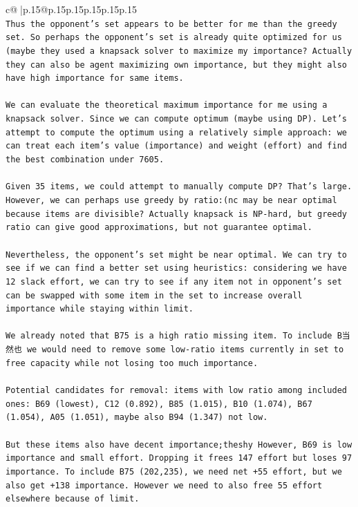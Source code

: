 \documentclass{article}
\begin{document}
{\begin{supertabular}{c@{$\;$}|p{.15\linewidth}@{}p{.15\linewidth}p{.15\linewidth}p{.15\linewidth}p{.15\linewidth}p{.15\linewidth}}
{{{\\ 
\texttt{Thus the opponent's set appears to be better for me than the greedy set. So perhaps the opponent's set is already quite optimized for us (maybe they used a knapsack solver to maximize my importance? Actually they can also be agent maximizing own importance, but they might also have high importance for same items.} \\
\\ 
\texttt{We can evaluate the theoretical maximum importance for me using a knapsack solver. Since we can compute optimum (maybe using DP). Let's attempt to compute the optimum using a relatively simple approach: we can treat each item's value (importance) and weight (effort) and find the best combination under 7605.} \\
\\ 
\texttt{Given 35 items, we could attempt to manually compute DP? That's large. However, we can perhaps use greedy by ratio:(nc may be near optimal because items are divisible? Actually knapsack is NP{-}hard, but greedy ratio can give good approximations, but not guarantee optimal.} \\
\\ 
\texttt{Nevertheless, the opponent's set might be near optimal. We can try to see if we can find a better set using heuristics: considering we have 12 slack effort, we can try to see if any item not in opponent's set can be swapped with some item in the set to increase overall importance while staying within limit.} \\
\\ 
\texttt{We already noted that B75 is a high ratio missing item. To include B当然也 we would need to remove some low{-}ratio items currently in set to free capacity while not losing too much importance.} \\
\\ 
\texttt{Potential candidates for removal: items with low ratio among included ones: B69 (lowest), C12 (0.892), B85 (1.015), B10 (1.074), B67 (1.054), A05 (1.051), maybe also B94 (1.347) not low.} \\
\\ 
\texttt{But these items also have decent importance;theshy However, B69 is low importance and small effort. Dropping it frees 147 effort but loses 97 importance. To include B75 (202,235), we need net +55 effort, but we also get +138 importance. However we need to also free 55 effort elsewhere because of limit.} \\
\\ 
}}}
\end{supertabular}}
\end{document}
